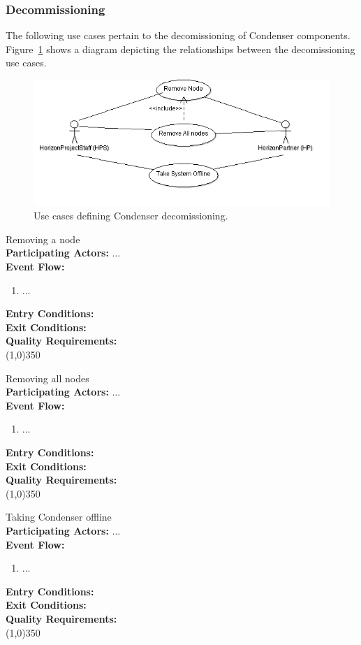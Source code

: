 \subsubsection{Decommissioning}		 
The following use cases pertain to the decomissioning of Condenser components. Figure~\ref{DecomissioningUse} shows a diagram depicting the relationships between the decomissioning use cases.
\begin{center}
	\begin{figure}[htbp]
		\includegraphics[scale=.5]{images/DecomissioningUse.png}
		\caption{Use cases defining Condenser decomissioning.\label{DecomissioningUse}}
	\end{figure}
\end{center}	

	Removing a node \\	 
	\textbf{Participating Actors:}  ... \\
	\textbf{Event Flow:}
	\begin{enumerate}
\item  ...
    \end{enumerate}
	\textbf{Entry Conditions:}\\
	\textbf{Exit Conditions:}\\
	\textbf{Quality Requirements:}\\
	\line(1,0){350}		

	Removing all nodes \\	 
	\textbf{Participating Actors:}  ... \\
	\textbf{Event Flow:}
	\begin{enumerate}
\item  ...
    \end{enumerate}
	\textbf{Entry Conditions:}\\
	\textbf{Exit Conditions:}\\
	\textbf{Quality Requirements:}\\
	\line(1,0){350}		

	Taking Condenser offline \\	 
	\textbf{Participating Actors:}  ... \\
	\textbf{Event Flow:}
	\begin{enumerate}
\item  ...
    \end{enumerate}
	\textbf{Entry Conditions:}\\
	\textbf{Exit Conditions:}\\
	\textbf{Quality Requirements:}\\
	\line(1,0){350}		